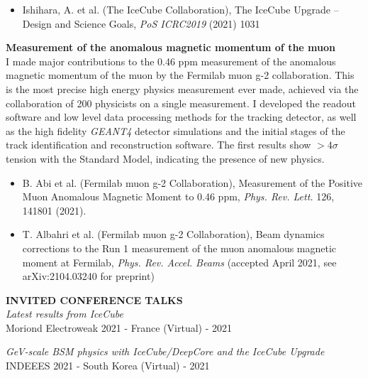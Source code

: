 \documentclass[a4paper,11pt]{article}
\renewcommand{\smallskip} {\vspace{0.1in}}
\begin{document}
\begin{itemize}
    \item Ishihara, A. et al. (The IceCube Collaboration), The IceCube Upgrade -- Design and Science Goals, \textit{PoS ICRC2019} (2021) 1031
\end{itemize}

\vspace{0.2cm}

{\bf Measurement of the anomalous magnetic momentum of the muon} \\ 
I made major contributions to the 0.46 ppm measurement of the anomalous magnetic momentum of the muon by the Fermilab muon g-2 collaboration. This is the most precise high energy physics measurement ever made, achieved via the collaboration of 200 physicists on a single measurement. I developed the readout software and low level data processing methods for the tracking detector, as well as the high fidelity \textit{GEANT4} detector simulations and the initial stages of the track identification and reconstruction software. The first results show $>4 \sigma$ tension with the Standard Model, indicating the presence of new physics.

\begin{itemize}
    \item B. Abi et al. (Fermilab muon g-2 Collaboration), Measurement of the Positive Muon Anomalous Magnetic Moment to 0.46 ppm,  \textit{Phys. Rev. Lett.} 126, 141801 (2021).  
    \item T. Albahri et al. (Fermilab muon g-2 Collaboration), Beam dynamics corrections to the Run 1 measurement of the muon anomalous magnetic moment at Fermilab, \textit{Phys. Rev. Accel. Beams} (accepted April 2021, see arXiv:2104.03240 for preprint)
\end{itemize}

\vspace{0.5cm}

\textbf{INVITED CONFERENCE TALKS ~~\hrulefill}\smallskip\\
%
{\it Latest results from IceCube} \\ 
 Moriond Electroweak 2021 - France (Virtual) - 2021
 
 {\it GeV-scale BSM physics with IceCube/DeepCore and the IceCube Upgrade} \\ 
 INDEEES 2021 - South Korea (Virtual) - 2021
\end{document}

